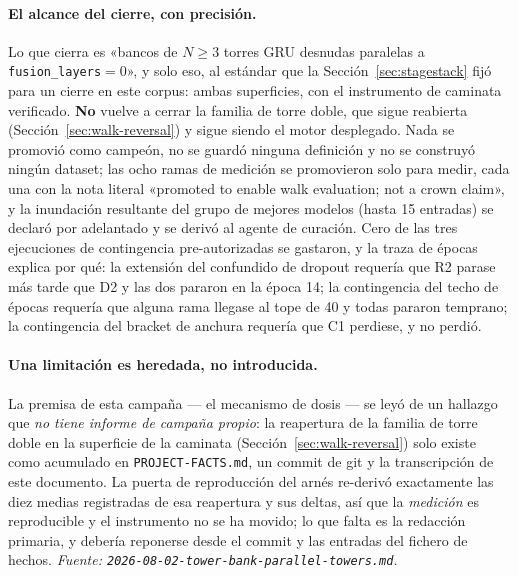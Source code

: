 \documentclass[11pt]{article}
\begin{document}
\paragraph{El alcance del cierre, con precisión.} Lo que cierra es «bancos de
$N\ge3$ torres GRU desnudas paralelas a \texttt{fusion\_layers}${}=0$», y solo
eso, al estándar que la Sección~\ref{sec:stagestack} fijó para un cierre en este
corpus: ambas superficies, con el instrumento de caminata verificado. \textbf{No}
vuelve a cerrar la familia de torre doble, que sigue reabierta
(Sección~\ref{sec:walk-reversal}) y sigue siendo
el motor desplegado. Nada se promovió como campeón, no se guardó ninguna
definición y no se construyó ningún dataset; las ocho ramas de medición se
promovieron solo para medir, cada una con la nota literal «promoted to enable walk
evaluation; not a crown claim», y la inundación resultante del grupo de mejores
modelos (hasta \num{15} entradas) se declaró por adelantado y se derivó al agente
de curación. Cero de las tres ejecuciones de contingencia pre-autorizadas se
gastaron, y la traza de épocas explica por qué: la extensión del confundido de
dropout requería que R2 parase más tarde que D2 y las dos pararon en la época
\num{14}; la contingencia del techo de épocas requería que alguna rama llegase al
tope de \num{40} y todas pararon temprano; la contingencia del bracket de anchura
requería que C1 perdiese, y no perdió.

\paragraph{Una limitación es heredada, no introducida.} La premisa de esta campaña
--- el mecanismo de dosis --- se leyó de un hallazgo que \emph{no tiene informe de
campaña propio}: la reapertura de la familia de torre doble en la superficie de la
caminata (Sección~\ref{sec:walk-reversal}) solo existe como acumulado en
\texttt{PROJECT-FACTS.md}, un commit de git y la transcripción de este documento.
La puerta de reproducción del arnés re-derivó exactamente las diez medias
registradas de esa reapertura y sus deltas, así que la \emph{medición} es
reproducible y el instrumento no se ha movido; lo que falta es la redacción
primaria, y debería reponerse desde el commit y las entradas del fichero de
hechos.
\emph{Fuente: \texttt{2026-08-02-tower-bank-parallel-towers.md}.}
\end{document}
